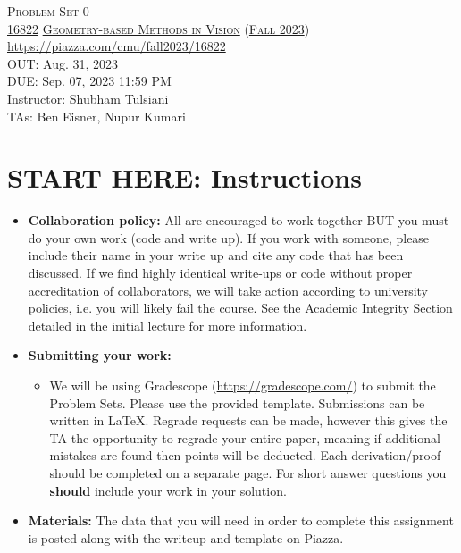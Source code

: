 \documentclass[11pt,addpoints,answers]{exam}
\title{\textsc{\hwName}} %
\author{}
\date{}
\date{}
\numberwithin{equation}{section} %
\numberwithin{figure}{section} %
\numberwithin{table}{section} %
\newcommand{\courseNum}{\href{https://geometric3d.github.io}{16822}}
\newcommand{\courseName}{\href{https://geometric3d.github.io}{Geometry-based Methods in Vision}}
\newcommand{\courseSem}{\href{https://geometric3d.github.io}{Fall 2023}}
\newcommand{\courseUrl}{\url{https://piazza.com/cmu/fall2023/16822}}
\newcommand{\hwNum}{Problem Set 0}
\newcommand{\hwTopic}{Linear Algebra }
\newcommand{\outDate}{Aug. 31, 2023}
\newcommand{\dueDate}{Sep. 07, 2023 11:59 PM}
\newcommand{\instructorName}{Shubham Tulsiani}
\newcommand{\taNames}{Ben Eisner, Nupur Kumari}
\begin{document}
\section*{}
\begin{center}
  \textsc{\LARGE \hwNum} \\
  \vspace{1em}
  \textsc{\large \courseNum{} \courseName{} (\courseSem)} \\
  \courseUrl\\
  \vspace{1em}
  OUT: \outDate \\
  DUE: \dueDate \\
  Instructor: \instructorName \\
  TAs: \taNames
\end{center}

\section*{START HERE: Instructions}
\begin{itemize}
\item \textbf{Collaboration policy:} All are encouraged to work together BUT you must do your own work (code and write up). If you work with someone, please include their name in your write up and cite any code that has been discussed. If we find highly identical write-ups or code without proper accreditation of collaborators, we will take action according to university policies, i.e. you will likely fail the course. See the \href{https://www.dropbox.com/s/z6o0tinc9eaez46/L01_Overview.pdf?dl=0}{Academic Integrity Section} detailed in the initial lecture for more information.


\item\textbf{Submitting your work:}

\begin{itemize}

\item We will be using Gradescope (\url{https://gradescope.com/}) to submit the Problem Sets. Please use the provided template. Submissions can be written in LaTeX. Regrade requests can be made, however this gives the TA the opportunity to regrade your entire paper, meaning if additional mistakes are found then points will be deducted.
Each derivation/proof should be  completed on a separate page. For short answer questions you \textbf{should} include your work in your solution.  
\end{itemize}

\item \textbf{Materials:} The data that you will need in order to complete this assignment is posted along with the writeup and template on Piazza.

\end{itemize}
\end{document}
